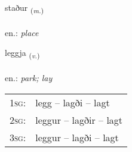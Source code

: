 \documentclass[frontgrid, backgrid]{flacards}\usepackage[]{graphicx}\usepackage[]{xcolor}
\begin{document}
\renewcommand{\blhead}{\vskip5pt {\small\bfseries\footnotesize Nafnorð | Noun }}
\renewcommand{\bcfoot}{\vskip5pt \hspace{2pt}{\small\bfseries\footnotesize 1K}}


{staður \small{\textsubscript{(\textit{m.})}} \\[1ex] %
\textphonetic{[staːðʏr]} \\
en.: \emph{place} \\  [2ex]
\renewcommand*{\arraystretch}{0.8}
}

\renewcommand{\flhead}{\vskip5pt \fboxsep=0pt {\small\bfseries\footnotesize Sagnorð | Verb}}
\renewcommand{\fcfoot}{\vskip5pt \fboxsep=0pt \hspace{2pt}{\small\bfseries\footnotesize 1K}}

\renewcommand{\blhead}{\vskip5pt {\small\bfseries\footnotesize Sagnorð | Verb }}
\renewcommand{\bcfoot}{\vskip5pt \hspace{2pt}{\small\bfseries\footnotesize 1K}}


{leggja \small{\textsubscript{(\textit{v.})}} \\[1ex] %
\textphonetic{[lɛca]} \\
en.: \emph{park; lay} \\  [2ex]
\renewcommand*{\arraystretch}{0.8}
\begin{tabular}{p{1cm}l}
\textsc{1sg}: & legg -- lagði -- lagt \\ 
\textsc{2sg}: & leggur -- lagðir -- lagt \\ 
\textsc{3sg}: & leggur -- lagði -- lagt \\ 
\end{tabular}
}

\renewcommand{\flhead}{\vskip5pt \fboxsep=0pt {\small\bfseries\footnotesize Fornafn | Pronoun}}
\renewcommand{\fcfoot}{\vskip5pt \fboxsep=0pt \hspace{2pt}{\small\bfseries\footnotesize 1K}}
\end{document}
